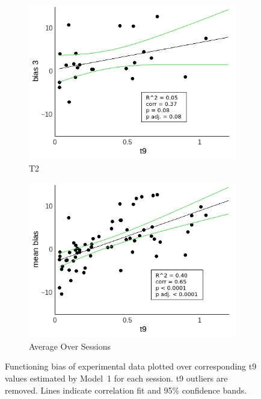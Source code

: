 \documentclass[a4paper]{scrreprt}
\begin{document}
\begin{figure}
\begin{subfigure}[b]{0.49\textwidth}
        \includegraphics[width=\textwidth]{figs/sec3/t9/t9no_diff_3_mod1dat.jpeg}
        \caption{T2}
    \end{subfigure}
    \begin{subfigure}[b]{0.49\textwidth}
        \includegraphics[width=\textwidth]{figs/sec3/t9/t9no_diff_mean_mod1dat.jpeg}
        \caption{Average Over Sessions}
    \end{subfigure}
\caption{Functioning bias of experimental data plotted over corresponding t9 values estimated by Model~1 for each session. t9 outliers are removed. Lines indicate correlation fit and 95\% confidence bands.}
\label{fig:t9no_diff_mod1dat}
\end{figure}
\end{document}
